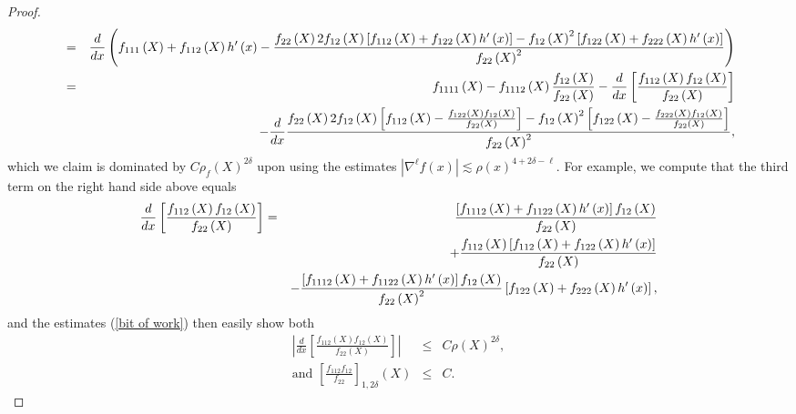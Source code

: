 \documentclass{amsart}
\theoremstyle{plain}
\numberwithin{equation}{section}
\begin{document}
\begin{proof}
\begin{eqnarray*}
&=&\frac{d}{dx}\left( f_{111}\left( X\right) +f_{112}\left( X\right)
h^{\prime }\left( x\right) -\frac{f_{22}\left( X\right) 2f_{12}\left(
X\right) \left[ f_{112}\left( X\right) +f_{122}\left( X\right) h^{\prime
}\left( x\right) \right] -f_{12}\left( X\right) ^{2}\left[ f_{122}\left(
X\right) +f_{222}\left( X\right) h^{\prime }\left( x\right) \right] }{%
f_{22}\left( X\right) ^{2}}\right)  \\
&=&f_{1111}\left( X\right) -f_{1112}\left( X\right) \frac{f_{12}\left(
X\right) }{f_{22}\left( X\right) }-\frac{d}{dx}\left[ \frac{f_{112}\left(
X\right) f_{12}\left( X\right) }{f_{22}\left( X\right) }\right]  \\
&&-\frac{d}{dx}\frac{f_{22}\left( X\right) 2f_{12}\left( X\right) \left[
f_{112}\left( X\right) -\frac{f_{122}\left( X\right) f_{12}\left( X\right) }{%
f_{22}\left( X\right) }\right] -f_{12}\left( X\right) ^{2}\left[
f_{122}\left( X\right) -\frac{f_{222}\left( X\right) f_{12}\left( X\right) }{%
f_{22}\left( X\right) }\right] }{f_{22}\left( X\right) ^{2}},
\end{eqnarray*}%
which we claim is dominated by $C\rho _{f}\left( X\right) ^{2\delta }$ upon
using the estimates $\left\vert \nabla ^{\ell }f\left( x\right) \right\vert
\lesssim \rho \left( x\right) ^{4+2\delta -\ell }$. For example, we compute
that the third term on the right hand side above equals%
\begin{eqnarray*}
\frac{d}{dx}\left[ \frac{f_{112}\left( X\right) f_{12}\left( X\right) }{%
f_{22}\left( X\right) }\right]  &=&\frac{\left[ f_{1112}\left( X\right)
+f_{1122}\left( X\right) h^{\prime }\left( x\right) \right] f_{12}\left(
X\right) }{f_{22}\left( X\right) } \\
&&+\frac{f_{112}\left( X\right) \left[ f_{112}\left( X\right) +f_{122}\left(
X\right) h^{\prime }\left( x\right) \right] }{f_{22}\left( X\right) } \\
&&-\frac{\left[ f_{1112}\left( X\right) +f_{1122}\left( X\right) h^{\prime
}\left( x\right) \right] f_{12}\left( X\right) }{f_{22}\left( X\right) ^{2}}%
\left[ f_{122}\left( X\right) +f_{222}\left( X\right) h^{\prime }\left(
x\right) \right] ,
\end{eqnarray*}%
and the estimates (\ref{bit of work}) then easily show both 
\begin{eqnarray*}
\left\vert \frac{d}{dx}\left[ \frac{f_{112}\left( X\right) f_{12}\left(
X\right) }{f_{22}\left( X\right) }\right] \right\vert  &\leq &C\rho \left(
X\right) ^{2\delta }, \\
\text{and }\left[ \frac{f_{112}f_{12}}{f_{22}}\right] _{1,2\delta }\left(
X\right)  &\leq &C.
\end{eqnarray*}


\end{proof}
\end{document}
